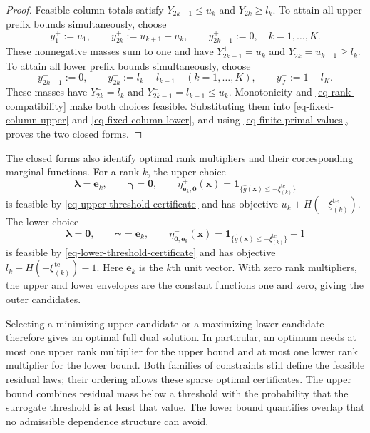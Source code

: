 \documentclass[review,11pt,3p,authoryear,nopreprintline]{elsarticle}
\begin{document}
\begin{proof}
  Feasible column totals satisfy $Y_{2k-1}\le u_k$ and $Y_{2k}\ge l_k$. To attain all upper prefix bounds simultaneously, choose
  \begin{equation}
    y_1^+:=u_1,\qquad
    y_{2k}^+:=u_{k+1}-u_k,\qquad
    y_{2k+1}^+:=0,\quad k=1,\ldots,K.
    \label{eq-upper-column-allocation}
  \end{equation}
  These nonnegative masses sum to one and have
  $Y_{2k-1}^+=u_k$ and $Y_{2k}^+=u_{k+1}\ge l_k$.
  To attain all lower prefix bounds simultaneously, choose
  \begin{equation}
    y_{2k-1}^-:=0,\qquad
    y_{2k}^-:=l_k-l_{k-1}\quad(k=1,\ldots,K),
    \qquad y_J^-:=1-l_K.
    \label{eq-lower-column-allocation}
  \end{equation}
  These masses have $Y_{2k}^-=l_k$ and
  $Y_{2k-1}^-=l_{k-1}\le u_k$.
  Monotonicity and \eqref{eq-rank-compatibility} make both choices feasible. Substituting them into \eqref{eq-fixed-column-upper} and \eqref{eq-fixed-column-lower}, and using \eqref{eq-finite-primal-values}, proves the two closed forms.
\end{proof}

The closed forms also identify optimal rank multipliers and their corresponding marginal functions. For a rank $k$, the upper choice
\[
  \bm\lambda=\bm e_k,\qquad \bm\gamma=\bm 0,\qquad
  \eta^+_{\bm e_k,\bm 0}(\bm x)=\mathbf1_{\{\hat g(\bm x)\le-\xi_{(k)}^{\mathrm{te}}\}}
\]
is feasible by \eqref{eq-upper-threshold-certificate} and has objective $u_k+H\left(-\xi_{(k)}^{\mathrm{te}}\right)$. The lower choice
\[
  \bm\lambda=\bm 0,\qquad \bm\gamma=\bm e_k,\qquad
  \eta^-_{\bm 0,\bm e_k}(\bm x)=\mathbf1_{\{\hat g(\bm x)\le-\xi_{(k)}^{\mathrm{te}}\}}-1
\]
is feasible by \eqref{eq-lower-threshold-certificate} and has objective $l_k+H\left(-\xi_{(k)}^{\mathrm{te}}\right)-1$. Here $\bm e_k$ is the $k$th unit vector. With zero rank multipliers, the upper and lower envelopes are the constant functions one and zero, giving the outer candidates.

Selecting a minimizing upper candidate or a maximizing lower candidate therefore gives an optimal full dual solution. In particular, an optimum needs at most one upper rank multiplier for the upper bound and at most one lower rank multiplier for the lower bound. Both families of constraints still define the feasible residual laws; their ordering allows these sparse optimal certificates. The upper bound combines residual mass below a threshold with the probability that the surrogate threshold is at least that value. The lower bound quantifies overlap that no admissible dependence structure can avoid.
\end{document}
